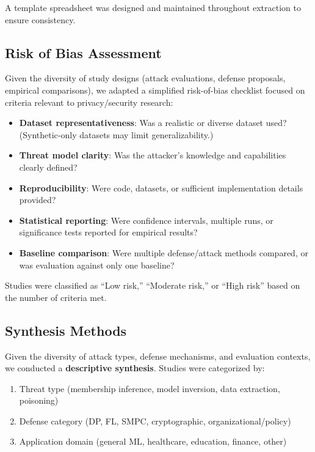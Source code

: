 \documentclass[11pt,a4paper]{article}
\begin{document}
A template spreadsheet was designed and maintained throughout extraction to ensure consistency.

\subsection{Risk of Bias Assessment}

Given the diversity of study designs (attack evaluations, defense proposals, empirical comparisons), we adapted a simplified risk-of-bias checklist focused on criteria relevant to privacy/security research:

\begin{itemize}
\item \textbf{Dataset representativeness}: Was a realistic or diverse dataset used? (Synthetic-only datasets may limit generalizability.)
\item \textbf{Threat model clarity}: Was the attacker's knowledge and capabilities clearly defined?
\item \textbf{Reproducibility}: Were code, datasets, or sufficient implementation details provided?
\item \textbf{Statistical reporting}: Were confidence intervals, multiple runs, or significance tests reported for empirical results?
\item \textbf{Baseline comparison}: Were multiple defense/attack methods compared, or was evaluation against only one baseline?
\end{itemize}

Studies were classified as ``Low risk,'' ``Moderate risk,'' or ``High risk'' based on the number of criteria met.

\subsection{Synthesis Methods}

Given the diversity of attack types, defense mechanisms, and evaluation contexts, we conducted a \textbf{descriptive synthesis}. Studies were categorized by:
\begin{enumerate}
\item Threat type (membership inference, model inversion, data extraction, poisoning)
\item Defense category (DP, FL, SMPC, cryptographic, organizational/policy)
\item Application domain (general ML, healthcare, education, finance, other)
\end{enumerate}
\end{document}

